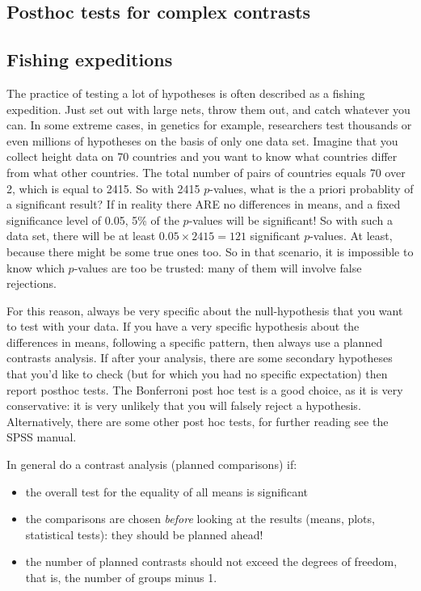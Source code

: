 \documentclass[]{report}\usepackage[]{graphicx}\usepackage[]{color}
\begin{document}
\subsection{Posthoc tests for complex contrasts}



\subsection{Fishing expeditions}
The practice of testing a lot of hypotheses is often described as a fishing expedition. Just set out with large nets, throw them out, and catch whatever you can. In some extreme cases, in genetics for example, researchers test thousands or even millions of hypotheses on the basis of only one data set. Imagine that you collect height data on 70 countries and you want to know what countries differ from what other countries. The total number of pairs of countries equals 70 over 2, which is equal to 2415. So with 2415 $p$-values, what is the a priori probablity of a significant result? If in reality there ARE no differences in means, and a fixed significance level of 0.05, 5\% of the $p$-values will be significant! So with such a data set, there will be at least $0.05 \times 2415 = 121$ significant $p$-values. At least, because there might be some true ones too. So in that scenario, it is impossible to know which $p$-values are too be trusted: many of them will involve false rejections.

For this reason, always be very specific about the null-hypothesis that you want to test with your data. If you have a very specific hypothesis about the differences in means, following a specific pattern, then always use a planned contrasts analysis. If after your analysis, there are some secondary hypotheses that you'd like to check (but for which you had no specific expectation) then report posthoc tests. The Bonferroni post hoc test is a good choice, as it is very conservative: it is very unlikely that you will falsely reject a hypothesis. Alternatively, there are some other post hoc tests, for further reading see the SPSS manual.

In general do a contrast analysis (planned comparisons) if:


\begin{itemize}
\item the overall test for the equality of all means is significant
\item the comparisons are chosen \textit{before} looking at the results (means, plots, statistical tests): they should be planned ahead!
\item the number of planned contrasts should not exceed the degrees of freedom, that is, the number of groups minus 1. 
\end{itemize}
\end{document}
